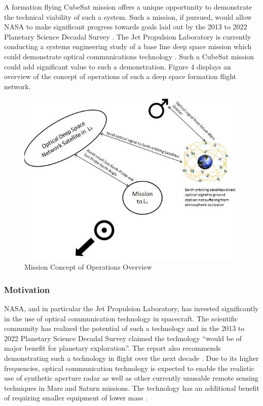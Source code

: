 A formation flying CubeSat mission offers a unique opportunity to demonstrate the technical viability of such a system. Such a mission, if pursued, would allow NASA to make significant progress towards goals laid out by the 2013 to 2022 Planetary Science Decadal Survey \cite{Planetary}. The Jet Propulsion Laboratory is currently conducting a systems engineering study of a base line deep space mission which could demonstrate optical communications technology \cite{Alvarez}. Such a CubeSat mission could add significant value to such a demonstration. Figure 4 displays an overview of the concept of operations of such a deep space formation flight network.
\begin{figure}[!ht]
\centering
\includegraphics[scale=0.65]{OV1.jpg}
\caption{Mission Concept of Operations Overview}
\end{figure}

\subsubsection{Motivation}
NASA, and in particular the Jet Propulsion Laboratory, has invested significantly in the use of optical communication technology in spacecraft. The scientific community has realized the potential of such a technology and in the 2013 to 2022 Planetary Science Decadal Survey claimed the technology ``would be of major benefit for planetary exploration''. The report also recommends demonstrating such a technology in flight over the next decade \cite{Planetary}. Due to its higher frequencies, optical communication technology is expected to enable the realistic use of synthetic aperture radar as well as other currently unusable remote sensing techniques in Mars and Saturn missions. The technology has an additional benefit of requiring smaller equipment of lower mass \cite{Hemmati2}.

